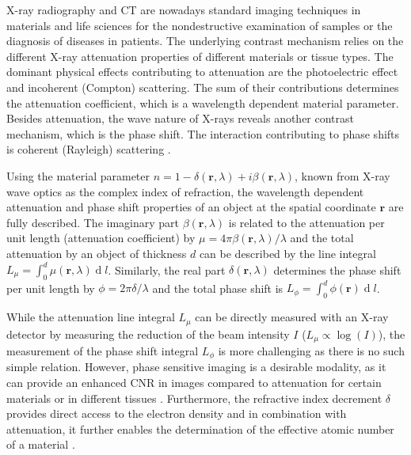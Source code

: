 \documentclass[aps,prl,preprint]{revtex4-1}
\renewcommand{\d}[1]{\ensuremath{\operatorname{d}\!{#1}}}
\begin{document}
\maketitle


X-ray radiography and \ac{CT} are nowadays standard imaging techniques in
materials and life sciences for the nondestructive examination of samples or
the diagnosis of diseases in patients. The underlying contrast mechanism
relies on the different X-ray attenuation properties of different materials
or tissue types. The dominant physical effects contributing to attenuation
are the photoelectric effect and incoherent (Compton) scattering. The sum of
their contributions determines the attenuation coefficient, which is a
wavelength dependent material parameter. Besides attenuation, the wave
nature of X-rays reveals another contrast mechanism, which is the phase
shift. The interaction contributing to phase shifts is coherent (Rayleigh)
scattering \cite{Als-Nielsen2011}.

Using the material parameter $n=1-\delta(\mathbf{r},\lambda) + i
\beta(\mathbf{r},\lambda)$, known from X-ray wave optics as the complex
index of refraction, the wavelength dependent attenuation and phase shift
properties of an object at the spatial coordinate $\mathbf{r}$ are fully
described. The imaginary part $\beta(\mathbf{r},\lambda)$ is related to the
attenuation per unit length (attenuation coefficient) by $\mu = 4 \pi
\beta(\mathbf{r},\lambda) / \lambda$ and the total attenuation by an object
of thickness $d$ can be described by the line integral $L_\mu = \int_0^d
\mu(\mathbf{r},\lambda) \d l$. Similarly, the real part
$\delta(\mathbf{r},\lambda)$ determines the phase shift per unit length by
$\phi = 2 \pi \delta / \lambda$ and the total phase shift is $L_\phi =
\int_0^d \phi(\mathbf{r}) \d l$.

While the attenuation line integral $L_\mu$ can be directly measured with an
X-ray detector by measuring the reduction of the beam intensity $I$ ($L_\mu
\propto \log(I)$), the measurement of the phase shift integral $L_\phi$ is
more challenging as there is no such simple relation. However, phase
sensitive imaging is a desirable modality, as it can provide an enhanced
\ac{CNR} in images compared to attenuation for certain
materials or in different tissues \cite{Pfeiffer2007a,McDonald2009}.
Furthermore, the refractive index decrement $\delta$ provides direct access
to the electron density \cite{Als-Nielsen2011} and in combination with
attenuation, it further enables the determination of the effective atomic
number of a material \cite{Qi2010}.
\end{document}
